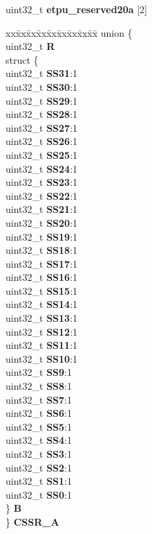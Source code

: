 \begin{DoxyCompactItemize}
\begin{tabbing}
\end{tabbing}\item 
\mbox{\label{structETPU__tag_ac29cc2ece8122d2d5dc35adf2948481a}} 
uint32\+\_\+t {\bfseries etpu\+\_\+reserved20a} \mbox{[}2\mbox{]}
\item 
\mbox{\label{structETPU__tag_a0b02de1c41912196f7e7649173cf79ae}} 
\begin{tabbing}
xx\=xx\=xx\=xx\=xx\=xx\=xx\=xx\=xx\=\kill
union \{\\
\>uint32\_t {\bfseries R}\\
\>struct \{\\
\>\>uint32\_t {\bfseries SS31}:1\\
\>\>uint32\_t {\bfseries SS30}:1\\
\>\>uint32\_t {\bfseries SS29}:1\\
\>\>uint32\_t {\bfseries SS28}:1\\
\>\>uint32\_t {\bfseries SS27}:1\\
\>\>uint32\_t {\bfseries SS26}:1\\
\>\>uint32\_t {\bfseries SS25}:1\\
\>\>uint32\_t {\bfseries SS24}:1\\
\>\>uint32\_t {\bfseries SS23}:1\\
\>\>uint32\_t {\bfseries SS22}:1\\
\>\>uint32\_t {\bfseries SS21}:1\\
\>\>uint32\_t {\bfseries SS20}:1\\
\>\>uint32\_t {\bfseries SS19}:1\\
\>\>uint32\_t {\bfseries SS18}:1\\
\>\>uint32\_t {\bfseries SS17}:1\\
\>\>uint32\_t {\bfseries SS16}:1\\
\>\>uint32\_t {\bfseries SS15}:1\\
\>\>uint32\_t {\bfseries SS14}:1\\
\>\>uint32\_t {\bfseries SS13}:1\\
\>\>uint32\_t {\bfseries SS12}:1\\
\>\>uint32\_t {\bfseries SS11}:1\\
\>\>uint32\_t {\bfseries SS10}:1\\
\>\>uint32\_t {\bfseries SS9}:1\\
\>\>uint32\_t {\bfseries SS8}:1\\
\>\>uint32\_t {\bfseries SS7}:1\\
\>\>uint32\_t {\bfseries SS6}:1\\
\>\>uint32\_t {\bfseries SS5}:1\\
\>\>uint32\_t {\bfseries SS4}:1\\
\>\>uint32\_t {\bfseries SS3}:1\\
\>\>uint32\_t {\bfseries SS2}:1\\
\>\>uint32\_t {\bfseries SS1}:1\\
\>\>uint32\_t {\bfseries SS0}:1\\
\>\} {\bfseries B}\\
\} {\bfseries CSSR\_A}\\


\end{tabbing}
\end{DoxyCompactItemize}
